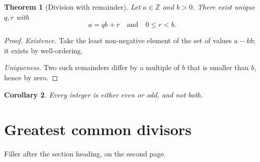 \documentclass[11pt]{article}
\newtheorem{theorem}{Theorem}
\newtheorem{corollary}[theorem]{Corollary}
\begin{document}
\begin{theorem}[Division with remainder]
Let $a \in \mathbb{Z}$ and $b > 0$. There exist unique $q, r$ with
\[
  a = qb + r \quad\text{and}\quad 0 \le r < b.
\]
\end{theorem}

\begin{proof}
\emph{Existence.} Take the least non-negative element of the set of
values $a - kb$; it exists by well-ordering.

\emph{Uniqueness.} Two such remainders differ by a multiple of $b$ that
is smaller than $b$, hence by zero.
\end{proof}

\begin{corollary}
Every integer is either even or odd, and not both.
\end{corollary}

\section{Greatest common divisors}

Filler after the section heading, on the second page.
\end{document}
